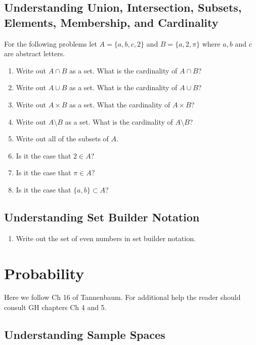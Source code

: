 \documentclass[11pt, letterpaper]{article}
\begin{document}
\subsection{Understanding Union, Intersection, Subsets, Elements, Membership, and Cardinality}
\noindent For the following problems let $A= \lbrace a,b, c, 2\rbrace$ and $B = \lbrace a, 2, \pi\rbrace$ where $a,b$ and $c$ are abstract letters.  
\begin{enumerate}
	\item Write out $A \cap B$ as a set. What is the cardinality of $A\cap B$?
	\item Write out $A \cup B$ as a set. What is the cardinality of $A\cup B$?
	\item Write out $A\times B$ as a set. What the cardinality of $A\times B$?
	\item Write out $A\setminus B$ as a set. What is the cardinality of $A\setminus B$?
	\item Write out all of the subsets of $A$.
	\item Is it the case that $2 \in A$?
	\item Is it the case that $\pi \in A$?
	\item Is it the case that $\lbrace a,b \rbrace \subset A$?
\end{enumerate}

\subsection{Understanding Set Builder Notation}
\begin{enumerate}
	\item Write out the set of even numbers in set builder notation.
\end{enumerate}

\newpage

\section{Probability }
Here we follow Ch 16 of Tannenbaum. 
For additional help the reader should consult GH chapters Ch 4 and 5. 

\subsection{Understanding Sample Spaces}
\end{document}
